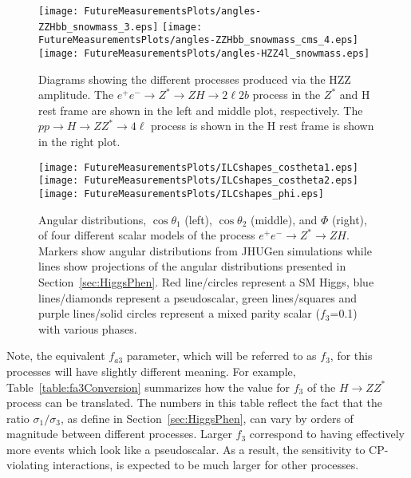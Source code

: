 \begin{figure}
\begin{center}
\texttt{[image: FutureMeasurementsPlots/angles-ZZHbb\_snowmass\_3.eps]}
\texttt{[image: FutureMeasurementsPlots/angles-ZZHbb\_snowmass\_cms\_4.eps]}
\texttt{[image: FutureMeasurementsPlots/angles-HZZ4l\_snowmass.eps]}
\caption{Diagrams showing the different processes produced
via the HZZ amplitude.  The $e^+e^-\to Z^*\to ZH\to 2\ell2b$ process
in the $Z^*$ and H rest frame are shown in the left and middle
plot, respectively.  The $pp\to H\to ZZ^*\to 4\ell$ process
is shown in the H rest frame is shown in the right plot.}
\label{fig:HZZprocesses}
\end{center}
\end{figure}

\begin{figure}
\begin{center}
\texttt{[image: FutureMeasurementsPlots/ILCshapes\_costheta1.eps]}
\texttt{[image: FutureMeasurementsPlots/ILCshapes\_costheta2.eps]}
\texttt{[image: FutureMeasurementsPlots/ILCshapes\_phi.eps]}
\caption{Angular distributions, $\cos\theta_1$ (left), 
$\cos\theta_2$ (middle), and $\Phi$ (right), of four different 
scalar models of the process $e^+e^-\to Z^*\to ZH$.  Markers
show angular distributions from JHUGen simulations while
lines show projections of the angular distributions presented
in Section~\ref{sec:HiggsPhen}. Red line/circles represent a 
SM Higgs, blue lines/diamonds represent a pseudoscalar, green
lines/squares and purple lines/solid circles represent a 
mixed parity scalar ($f_3$=0.1) with various phases.}
\label{fig:ILCprojections}
\end{center}
\end{figure}

Note, the equivalent $f_{a3}$ parameter, which will be referred
to as $f_3$, for this processes will 
have slightly different meaning.  For example, 
Table~\ref{table:fa3Conversion} summarizes
how the value for $f_3$ of the $H\to ZZ^*$ process can be 
translated.  The numbers in this table reflect the fact that 
the ratio $\sigma_1/\sigma_3$, as define in 
Section~\ref{sec:HiggsPhen}, can vary by orders of magnitude
between different processes.  Larger $f_3$ correspond to having
effectively more events which look like a pseudoscalar.  As a 
result, the sensitivity to CP-violating interactions, is
expected to be much larger for other processes.  


